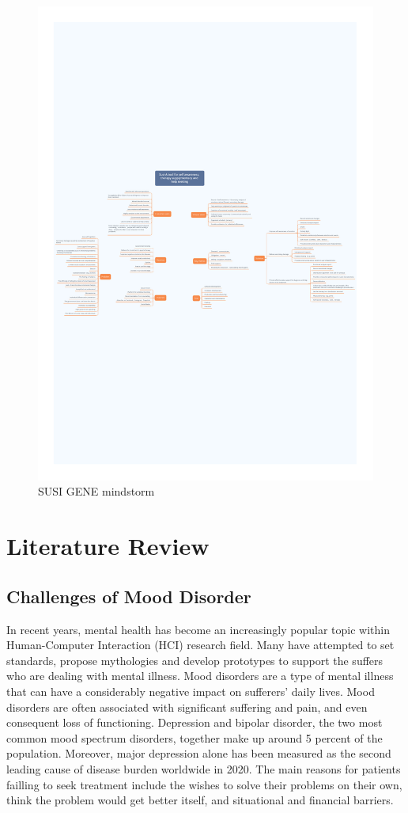 \documentclass[manuscript,screen]{acmart}
\begin{document}
\begin{figure}[h]
  \centering
  \includegraphics[width=\linewidth]{Xmind.pdf}
  \caption{SUSI GENE mindstorm}
  \label{Xmind}
\end{figure}

\section{Literature Review}
\subsection{Challenges of Mood Disorder}
In recent years, mental health has become an increasingly popular topic within Human-Computer Interaction (HCI) research field. Many have attempted to set standards, propose mythologies and develop prototypes to support the suffers who are dealing with mental illness. Mood disorders are a type of mental illness that can have a considerably negative impact on sufferers’ daily lives. Mood disorders are often associated with significant suffering and pain, and even consequent loss of functioning.\cite{american2013diagnostic}
Depression and bipolar disorder, the two most common mood spectrum disorders, together make up around 5 percent of the population.\cite{world2017depression} Moreover, major depression alone has been measured as the second leading cause of disease burden worldwide in 2020.\cite{lopez1998global}
The main reasons for patients failling to seek treatment include the wishes to solve their problems on their own, think the problem would get better itself, and situational and financial barriers.
\end{document}
